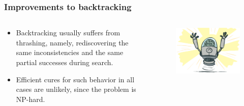 \documentclass[
	11pt,
]{beamer}
\begin{document}
\begin{frame}
    \frametitle{Improvements to backtracking}
    \begin{columns}
    \begin{column}{0.5\textwidth}
        \begin{itemize}
            \item Backtracking usually suffers from thrashing, namely, rediscovering the same inconsistencies and the same partial successes during search.
            \bigskip
            \item Efficient cures for such behavior in all cases are unlikely, since the problem is NP-hard.
        \end{itemize}
    \end{column}
    \begin{column}{.5\textwidth}
        \begin{figure}[h]
            \centering
            \includegraphics[scale=0.3]{Figs/improve.png}
        \end{figure}
    \end{column}
\end{columns}
\end{frame}
\end{document}
